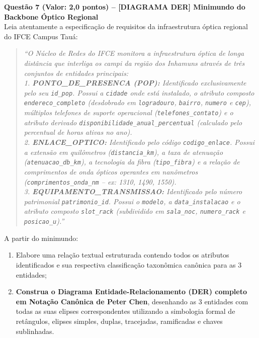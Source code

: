 \documentclass[11pt,a4paper]{article}
\begin{document}
\noindent\textbf{Questão 7 (Valor: 2,0 pontos) -- [DIAGRAMA DER] Minimundo do Backbone Óptico Regional}\\[0.1cm]
Leia atentamente a especificação de requisitos da infraestrutura óptica regional do IFCE Campus Tauá:
\begin{quote}\small
\textit{``O Núcleo de Redes do IFCE monitora a infraestrutura óptica de longa distância que interliga os campi da região dos Inhamuns através de três conjuntos de entidades principais:\\
1. \textbf{PONTO\_DE\_PRESENCA (POP):} Identificado exclusivamente pelo seu \texttt{id\_pop}. Possui a \texttt{cidade} onde está instalado, o atributo composto \texttt{endereco\_completo} (desdobrado em \texttt{logradouro}, \texttt{bairro}, \texttt{numero} e \texttt{cep}), múltiplos telefones de suporte operacional (\texttt{telefones\_contato}) e o atributo derivado \texttt{disponibilidade\_anual\_percentual} (calculado pelo percentual de horas ativas no ano).\\
2. \textbf{ENLACE\_OPTICO:} Identificado pelo código \texttt{codigo\_enlace}. Possui a extensão em quilômetros (\texttt{distancia\_km}), a taxa de atenuação (\texttt{atenuacao\_db\_km}), a tecnologia da fibra (\texttt{tipo\_fibra}) e a relação de comprimentos de onda ópticos operantes em nanômetros (\texttt{comprimentos\_onda\_nm} -- ex: 1310, 1490, 1550).\\
3. \textbf{EQUIPAMENTO\_TRANSMISSAO:} Identificado pelo número patrimonial \texttt{patrimonio\_id}. Possui o \texttt{modelo}, a \texttt{data\_instalacao} e o atributo composto \texttt{slot\_rack} (subdividido em \texttt{sala\_noc}, \texttt{numero\_rack} e \texttt{posicao\_u}).''}
\end{quote}

\noindent A partir do minimundo:
\begin{enumerate}[label=\alph*),itemsep=1pt]
  \item Elabore uma relação textual estruturada contendo todos os atributos identificados e sua respectiva classificação taxonômica canônica para as 3 entidades;
  \item \textbf{Construa o Diagrama Entidade-Relacionamento (DER) completo em Notação Canônica de Peter Chen}, desenhando as 3 entidades com todas as suas elipses correspondentes utilizando a simbologia formal de retângulos, elipses simples, duplas, tracejadas, ramificadas e chaves sublinhadas.
\end{enumerate}
\end{document}
